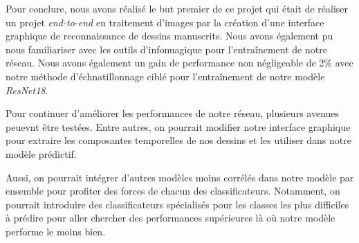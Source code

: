 Pour conclure, nous avons réalisé le but premier de ce projet qui était de réaliser un projet \emph{end-to-end} en traitement d'images par la création d'une interface graphique de reconnaissance de dessins manuscrits. 
Nous avons également pu nous familiariser avec les outils d'infonuagique pour l'entraînement de notre réseau. 
Nous avons également un gain de performance non négligeable de 2\% avec notre méthode d'échnatillonnage ciblé pour l'entraînement de notre modèle \emph{ResNet18}.

Pour continuer d'améliorer les performances de notre réseau, plusieurs avenues peuevnt être testées.
Entre autres, on pourrait modifier notre interface graphique pour extraire les composantes temporelles de nos dessins et les utiliser dans notre modèle prédictif.

Aussi, on pourrait intégrer d'autres modèles moins corrélés dans notre modèle par ensemble pour profiter des forces de chacun des classificateurs.
Notamment, on pourrait introduire des classificateurs spécialisés pour les classes les plus difficiles à prédire pour aller chercher des performances supérieures là où notre modèle performe le moins bien.
